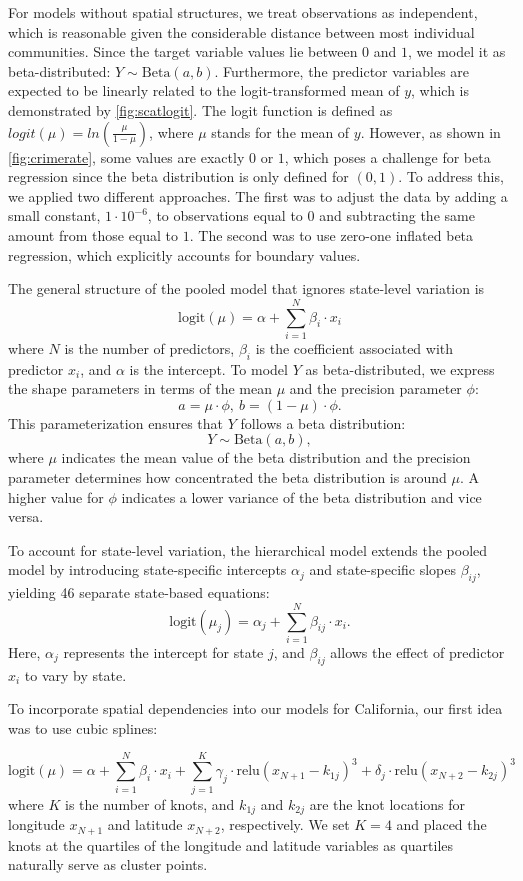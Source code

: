 {\color{cyan}
For models without spatial structures, we treat observations as independent, which is reasonable given the considerable distance between most individual communities. Since the target variable values lie between $0$ and $1$, we model it as beta-distributed: $Y \sim \text{Beta}(a, b)$. Furthermore, the predictor variables are expected to be linearly related to the logit-transformed mean of $y$, which is demonstrated by \autoref{fig:scatlogit}. The logit function is defined as $logit(\mu) = ln(\frac{\mu}{1-\mu})$, where $\mu$ stands for the mean of $y$. However, as shown in \autoref{fig:crimerate}, some values are exactly $0$ or $1$, which poses a challenge for beta regression since the beta distribution is only defined for $(0,1)$. To address this, we applied two different approaches. The first was to adjust the data by adding a small constant, $1\cdot10^{-6}$, to observations equal to $0$ and subtracting the same amount from those equal to $1$. The second was to use zero-one inflated beta regression, which explicitly accounts for boundary values.


The general structure of the pooled model that ignores state-level variation is $$\text{logit}(\mu) = \alpha + \sum_{i=1}^N{\beta_i \cdot x_i}$$ where $N$ is the number of predictors, $\beta_i$ is the coefficient associated with predictor $x_i$, and $\alpha$ is the intercept. To model $Y$ as beta-distributed, we express the shape parameters in terms of the mean $\mu$ and the precision parameter $\phi$: $$a = \mu \cdot \phi, \ b = (1 - \mu) \cdot \phi.$$ 
This parameterization ensures that $Y$ follows a beta distribution: $$Y \sim \text{Beta}(a, b),$$
where $\mu$ indicates the mean value of the beta distribution and the precision parameter determines how concentrated the beta distribution is around $\mu$. A higher value for $\phi$ indicates a lower variance of the beta distribution and vice versa.

To account for state-level variation, the hierarchical model extends the pooled model by introducing state-specific intercepts $\alpha_j$ and state-specific slopes $\beta_{ij}$, yielding 46 separate state-based equations: $$\text{logit}(\mu_j) = \alpha_j + \sum_{i=1}^N{\beta_{ij} \cdot x_i}.$$ Here, $\alpha_j$ represents the intercept for state $j$, and 
$\beta_{ij}$ allows the effect of predictor $x_i$ to vary by state.

To incorporate spatial dependencies into our models for California, our first idea was to use cubic splines:

$$\text{logit}(\mu) = \alpha + \sum_{i=1}^N{\beta_i \cdot x_i} + \sum_{j=1}^K{\gamma_j \cdot \text{relu}{(x_{N+1} -k_{1j})}^3 + \delta_j \cdot \text{relu}{(x_{N+2} - k_{2j})}^3}$$ where $K$ is the number of knots, and $k_{1j}$ and $k_{2j}$ are the knot locations for longitude $x_{N+1}$ and latitude $x_{N+2}$, respectively. We set $K = 4$ and placed the knots at the quartiles of the longitude and latitude variables as quartiles naturally serve as cluster points.

}

